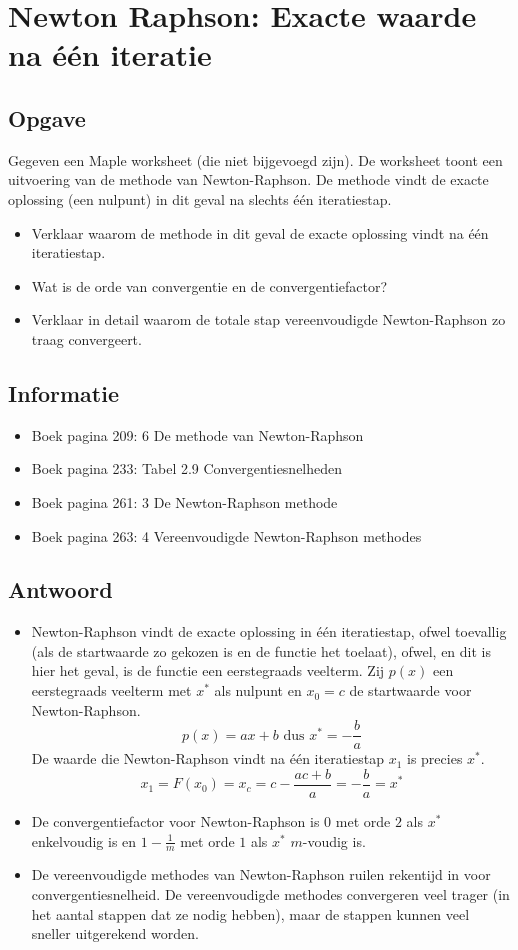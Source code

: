 \documentclass[examenvragen.tex]{subfiles}
\begin{document}
\section{Newton Raphson: Exacte waarde na \'e\'en iteratie}
\subsection{Opgave}
Gegeven een Maple worksheet (die niet bijgevoegd zijn). De worksheet toont een uitvoering van de methode van Newton-Raphson. De methode vindt de exacte oplossing (een nulpunt) in dit geval na slechts \'e\'en iteratiestap. 
\begin{itemize}
\item Verklaar waarom de methode in dit geval de exacte oplossing vindt na \'e\'en iteratiestap.
\item Wat is de orde van convergentie en de convergentiefactor? 
\item Verklaar in detail waarom de totale stap vereenvoudigde Newton-Raphson zo traag convergeert.
\end{itemize}

\subsection{Informatie}
\begin{itemize}
\item Boek pagina 209: 6 De methode van Newton-Raphson
\item Boek pagina 233: Tabel 2.9 Convergentiesnelheden
\item Boek pagina 261: 3 De Newton-Raphson methode
\item Boek pagina 263: 4 Vereenvoudigde Newton-Raphson methodes
\end{itemize}

\subsection{Antwoord}
\begin{itemize}
\item
Newton-Raphson vindt de exacte oplossing in \'e\'en iteratiestap, ofwel toevallig (als de startwaarde zo gekozen is en de functie het toelaat), ofwel, en dit is hier het geval, is de functie een eerstegraads veelterm.
Zij $p(x)$ een eerstegraads veelterm met $x^{*}$ als nulpunt en $x_0 = c$ de startwaarde voor Newton-Raphson.
\[
p(x) = ax+b \text{ dus } x^{*} = -\frac{b}{a}
\]
De waarde die Newton-Raphson vindt na \'e\'en iteratiestap $x_1$ is precies $x^*$.
\[
x_1 = F(x_0) = x_c = c - \frac{ac + b}{a} = -\frac{b}{a} = x^{*}
\]

\item De convergentiefactor voor Newton-Raphson is $0$ met orde $2$ als $x^{*}$ enkelvoudig is en $1-\frac{1}{m}$ met orde $1$ als $x^{*}$ $m$-voudig is.

\item De vereenvoudigde methodes van Newton-Raphson ruilen rekentijd in voor convergentiesnelheid. De vereenvoudigde methodes convergeren veel trager (in het aantal stappen dat ze nodig hebben), maar de stappen kunnen veel sneller uitgerekend worden.


\end{itemize}
\end{document}
